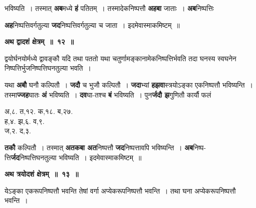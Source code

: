 \documentclass[11pt, openany]{book}
\begin{document}
\noindent भविष्यति~। तस्मात् \textbf{अब}मध्ये \textbf{हं} पतितम्~। तस्मादेकनिष्पत्तौ \textbf{अहबा} जाताः~। \textbf{अब}निष्पत्तिः 

\newpage
\noindent \textbf{अह}निष्पत्तिवर्गतुल्या \textbf{जद}निष्पत्तिवर्गतुल्या च जाता~। इदमेवास्माकमिष्टम्~॥ 
\vspace{2mm}

\begin{center}
\textbf{\large अथ द्वादशं क्षेत्रम्~॥~१२~॥}
\end{center}

{\ab द्वयोर्घनयोर्मध्ये द्वावङ्कौ यदि तथा पततो यथा चतुर्णामङ्कानामेकनिष्पत्तिर्भवति तदा घनस्य स्वघनेन निष्पत्तिर्भुजनिष्पत्तिघनतुल्या भवति~। }

\begin{flushleft}
\begin{minipage}[t]{0.58\textwidth}
\hspace{4mm} यथा \textbf{अबौ} घनौ कल्पितौ~। \textbf{जदौ} च भुजौ कल्पितौ~। \textbf{जदा}भ्यां \textbf{हझवा}स्त्रयोऽङ्का एकनिष्पत्तौ भविष्यन्ति~। तस्मा\textbf{ज्जह}घातः \textbf{अं} भविष्यति~। \textbf{दव}घा-तश्च \textbf{बं} भविष्यति~। पुन\textbf{र्जदौ झ}गुणितौ कार्यौ फलं
\end{minipage} 
\hfill
\begin{minipage}[t]{0.32\textwidth}
\begin{center}
अ,८. त,१२. क,१८. ब,२७.\\
ह,४. झ,६. व,९.\\
ज,२. द,३.
\end{center}
\end{minipage}
\end{flushleft}
\vspace{-3mm}

\noindent \textbf{तकौ} कल्पितौ~। तस्मात् \textbf{अतकबा अत}निष्पत्तौ \textbf{जद}निष्पत्तावपि भविष्यन्ति~। \textbf{अब}निष्प-त्ति\textbf{र्जद}निष्पत्तिघनतुल्या भविष्यति~। इदमेवास्माकमिष्टम्~॥ 
\vspace{2mm}

\begin{center}
\textbf{\large अथ त्रयोदशं क्षेत्रम्~॥~१३~॥}
\end{center}

{\ab येऽङ्का एकरूपनिष्पत्तौ भवन्ति तेषां वर्गा अप्येकरूपनिष्पत्तौ भवन्ति~। तथा घना अप्येकरूपनिष्पत्तौ भवन्ति~। }
\end{document}
